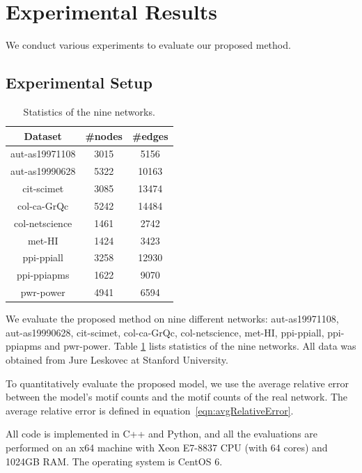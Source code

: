 \section{Experimental Results}
\label{sec:exp}

We conduct various experiments to evaluate our proposed method.

\subsection{Experimental Setup}

\begin{table}[t]
\centering
\begin{tabular}{|c|c@{ }|c@{ }|}
\hline
Dataset             &   \#nodes       &   \#edges \\ \hline
aut-as19971108 & 3015 & 5156 \\\hline
aut-as19990628 & 5322 & 10163 \\\hline
cit-scimet & 3085 & 13474 \\\hline
col-ca-GrQc & 5242 & 14484 \\\hline
col-netscience & 1461 & 2742 \\\hline
met-HI & 1424 & 3423 \\\hline
ppi-ppiall & 3258 & 12930 \\\hline
ppi-ppiapms & 1622 & 9070 \\\hline
pwr-power & 4941 & 6594 \\\hline
\end{tabular}
\caption{Statistics of the nine networks.}
\label{tb:statistics}
\end{table}


 We evaluate the proposed method on nine different networks: aut-as19971108, aut-as19990628, cit-scimet, col-ca-GrQc, col-netscience, met-HI, ppi-ppiall, ppi-ppiapms and pwr-power.
Table \ref{tb:statistics} lists statistics of the nine networks.  All data was obtained from Jure Leskovec at Stanford University.

 To quantitatively evaluate the proposed model, we use the average relative error between the model's motif counts and the motif counts of the real network.  The average relative error is defined in equation~\ref{eqn:avgRelativeError}.

All code is implemented in C++ and Python, and all the evaluations are performed on an x64 machine with Xeon E7-8837 CPU (with 64 cores) and 1024GB RAM. The operating system is CentOS 6. 

